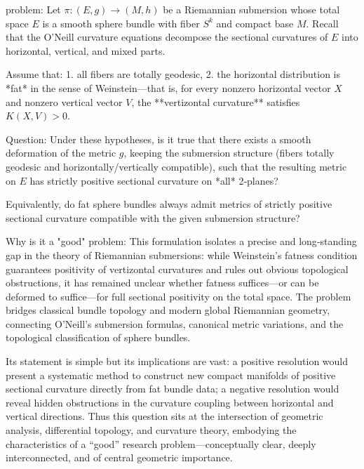 problem:  
Let $\pi:(E,g)\to (M,h)$ be a Riemannian submersion whose total space $E$ is a smooth sphere bundle with fiber $S^k$ and compact base $M$.  Recall that the O’Neill curvature equations decompose the sectional curvatures of $E$ into horizontal, vertical, and mixed parts.  

Assume that:  
1. all fibers are totally geodesic,  
2. the horizontal distribution is *fat* in the sense of Weinstein—that is, for every nonzero horizontal vector $X$ and nonzero vertical vector $V$, the **vertizontal curvature** satisfies $K(X,V)>0$.  

Question:  
Under these hypotheses, is it true that there exists a smooth deformation of the metric $g$, keeping the submersion structure (fibers totally geodesic and horizontally/vertically compatible), such that the resulting metric on $E$ has strictly positive sectional curvature on *all* 2‑planes?  

Equivalently, do fat sphere bundles always admit metrics of strictly positive sectional curvature compatible with the given submersion structure?  

Why is it a "good" problem:  
This formulation isolates a precise and long‑standing gap in the theory of Riemannian submersions: while Weinstein’s fatness condition guarantees positivity of vertizontal curvatures and rules out obvious topological obstructions, it has remained unclear whether fatness suffices—or can be deformed to suffice—for full sectional positivity on the total space.  The problem bridges classical bundle topology and modern global Riemannian geometry, connecting O’Neill’s submersion formulas, canonical metric variations, and the topological classification of sphere bundles.  

Its statement is simple but its implications are vast: a positive resolution would present a systematic method to construct new compact manifolds of positive sectional curvature directly from fat bundle data; a negative resolution would reveal hidden obstructions in the curvature coupling between horizontal and vertical directions.  Thus this question sits at the intersection of geometric analysis, differential topology, and curvature theory, embodying the characteristics of a “good” research problem—conceptually clear, deeply interconnected, and of central geometric importance.